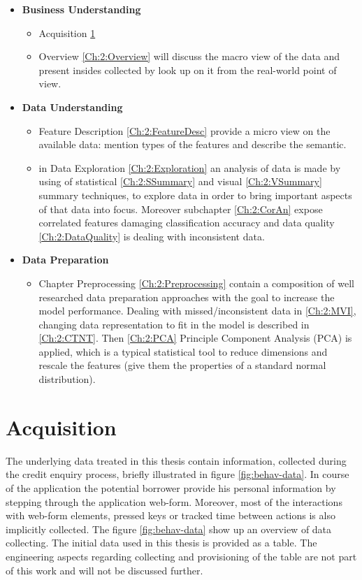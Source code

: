 \begin{itemize}
    \item \textbf{Business Understanding }  
    \begin{itemize}
        \item Acquisition \ref{Ch:2:Acquisition} 
        \item Overview \ref{Ch:2:Overview} will discuss the macro view of the data and present insides collected by look up on it from the real-world point of view.
    \end{itemize}
    \item \textbf{Data Understanding }
        \begin{itemize}
            \item Feature Description \ref{Ch:2:FeatureDesc} provide a micro view on the available data: mention types of the features and describe the semantic.
            \item in Data Exploration \ref{Ch:2:Exploration} an  analysis of data is made by using of statistical \ref{Ch:2:SSummary} and visual \ref{Ch:2:VSummary} summary techniques, to explore data in order to bring important aspects of that data into focus. Moreover subchapter \ref{Ch:2:CorAn} expose correlated features damaging classification accuracy and data quality \ref{Ch:2:DataQuality} is dealing with inconsistent data.
        \end{itemize}
    \item \textbf{Data Preparation }
            \begin{itemize}
                \item Chapter Preprocessing \ref{Ch:2:Preprocessing} contain a composition of well researched data preparation approaches with the goal to increase the model performance. Dealing with missed/inconsistent data in \ref{Ch:2:MVI}, changing data representation to fit in the model is described in \ref{Ch:2:CTNT}. Then \ref{Ch:2:PCA} Principle Component Analysis (PCA) is applied, which is a typical statistical tool to reduce dimensions and rescale the features (give them the properties of a standard normal distribution).
        \end{itemize}
\end{itemize}

\section{Acquisition}\label{Ch:2:Acquisition}
The underlying data treated in this thesis contain information, collected during the credit enquiry process, briefly illustrated in figure \ref{fig:behav-data}. In course of the application the potential borrower provide his personal information by stepping through the application web-form. Moreover, most of the interactions with web-form elements, pressed keys or tracked time between actions is also implicitly collected. The figure \ref{fig:behav-data} show up an overview of data collecting.
The initial data used in this thesis is provided as a table. The engineering aspects regarding collecting and provisioning of the table are not part of this work and will not be discussed further. 

